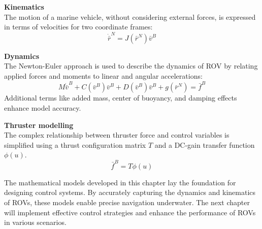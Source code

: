 \textbf{Kinematics} \\
The motion of a marine vehicle, without considering external forces, 
is expressed in terms of velocities for two coordinate frames:
$$
\dot{\bar{r}}^N=J(\bar{r}^N) \bar{v}^B
$$

\textbf{Dynamics} \\
The Newton-Euler approach is used to describe the dynamics of ROV by relating applied 
forces and moments to linear and angular accelerations:
$$
M \dot{\bar{v}}^B + C(\bar{v}^B) \bar{v}^B+D(\bar{v}^B) \bar{v}^B+g(\bar{r}^N)= \bar{f}^B
$$
Additional terms like added mass, center of buoyancy, and damping effects enhance model accuracy.

\textbf{Thruster modelling} \\
The complex relationship between thruster force and control variables 
is simplified using a thrust configuration matrix $T$ and a DC-gain transfer function $\phi(u)$.
$$
\bar{f}^B=T\phi(u)
$$

The mathematical models developed in this chapter lay the foundation for designing control systems. 
By accurately capturing the dynamics and kinematics of ROVs, these models enable precise navigation 
underwater. The next chapter will implement effective control strategies and enhance the 
performance of ROVs in various scenarios.